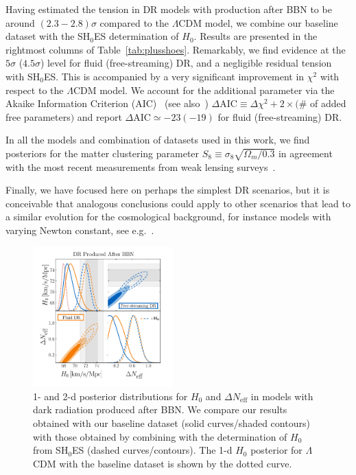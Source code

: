 \documentclass[aps,prd,twocolumn,notitlepage,
superscriptaddress,
nofootinbib,floatfix]{revtex4-2}
\newcommand{\AIC}{\Delta \textrm{AIC}}
\newcommand{\DNeff}{\Delta N_\text{eff}}
\begin{document}
Having estimated the tension in DR models with production after BBN to be around $(2.3-2.8)\sigma$ compared to the $\Lambda$CDM model, we combine our baseline dataset with the SH$_0$ES determination of $H_0$.
 Results are presented in the rightmost columns of Table~\ref{tab:plusshoes}. Remarkably, we find evidence at the $5\sigma$ ($4.5\sigma$) level for fluid (free-streaming) DR, and a negligible residual tension with SH$_0$ES. This is accompanied by a very significant improvement in $\chi^2$ with respect to the $\Lambda$CDM model. We account for the additional parameter via the Akaike Information Criterion (AIC)~\cite{1100705} (see also~\cite{Liddle:2007fy}) $\AIC\equiv \Delta\chi^2 + 2\times($\# of added free parameters$)$ and report $\AIC\simeq -23(-19)$ for fluid (free-streaming) DR.


In all the models and combination of datasets used in this work, we find posteriors for the matter clustering parameter $S_8\equiv \sigma_8\sqrt{\Omega_m/0.3}$ in agreement with the most recent measurements from weak lensing surveys~\cite{Kilo-DegreeSurvey:2023gfr}.

Finally, we have focused here on perhaps the simplest DR scenarios, but it is conceivable that analogous conclusions could apply to other scenarios that lead to a similar evolution for the cosmological background, for instance models with varying Newton constant, see e.g.~\cite{Ballesteros:2020sik}.




\begin{figure}
    \includegraphics[width=0.48\textwidth]{figures_21_4/main_H0tension.pdf}
    \caption{1- and 2-d posterior distributions for $H_0$ and $\DNeff$ in models with dark radiation produced after BBN. We compare our results obtained with our baseline dataset  (solid curves/shaded contours) with those obtained by combining with the determination of $H_0$ from SH$_0$ES (dashed curves/contours). The 1-d $H_0$ posterior for $\Lambda$CDM with the baseline dataset is shown by the dotted curve.}
    \label{fig:SHOES}
\end{figure}
\end{document}
